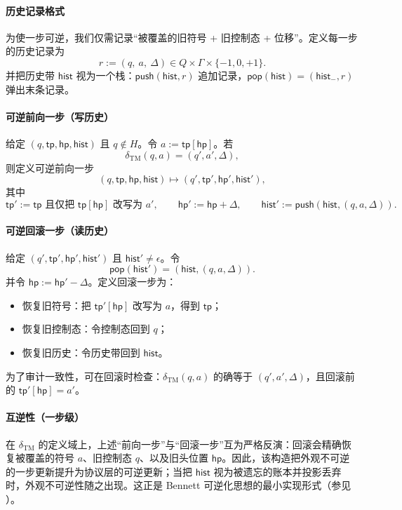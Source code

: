 \paragraph{历史记录格式}
为使一步可逆，我们仅需记录“被覆盖的旧符号 + 旧控制态 + 位移”。定义每一步的历史记录为
$$
r:=(q,\ a,\ \Delta)\in Q\times\Gamma\times\{-1,0,+1\}.
$$
并把历史带 \(\mathsf{hist}\) 视为一个栈：\(\mathsf{push}(\mathsf{hist},r)\) 追加记录，\(\mathsf{pop}(\mathsf{hist})=(\mathsf{hist}_-,r)\) 弹出末条记录。

\paragraph{可逆前向一步（写历史）}
给定 \((q,\mathsf{tp},\mathsf{hp},\mathsf{hist})\) 且 \(q\notin H\)。令 \(a:=\mathsf{tp}[\mathsf{hp}]\)。若
$$
\delta_{\mathrm{TM}}(q,a)=(q',a',\Delta),
$$
则定义可逆前向一步
$$
(q,\mathsf{tp},\mathsf{hp},\mathsf{hist})\mapsto(q',\mathsf{tp}',\mathsf{hp}',\mathsf{hist}'),
$$
其中
$$
\mathsf{tp}' := \mathsf{tp}\text{ 且仅把 }\mathsf{tp}[\mathsf{hp}]\text{ 改写为 }a',\qquad
\mathsf{hp}':=\mathsf{hp}+\Delta,\qquad
\mathsf{hist}':=\mathsf{push}(\mathsf{hist},(q,a,\Delta)).
$$

\paragraph{可逆回滚一步（读历史）}
给定 \((q',\mathsf{tp}',\mathsf{hp}',\mathsf{hist}')\) 且 \(\mathsf{hist}'\neq\epsilon\)。令
$$
\mathsf{pop}(\mathsf{hist}')=(\mathsf{hist},(q,a,\Delta)).
$$
并令 \(\mathsf{hp}:=\mathsf{hp}'-\Delta\)。定义回滚一步为：
\begin{itemize}
  \item 恢复旧符号：把 \(\mathsf{tp}'[\mathsf{hp}]\) 改写为 \(a\)，得到 \(\mathsf{tp}\)；
  \item 恢复旧控制态：令控制态回到 \(q\)；
  \item 恢复旧历史：令历史带回到 \(\mathsf{hist}\)。
\end{itemize}
为了审计一致性，可在回滚时检查：\(\delta_{\mathrm{TM}}(q,a)\) 的确等于 \((q',a',\Delta)\)，且回滚前的 \(\mathsf{tp}'[\mathsf{hp}]=a'\)。

\paragraph{互逆性（一步级）}
在 \(\delta_{\mathrm{TM}}\) 的定义域上，上述“前向一步”与“回滚一步”互为严格反演：回滚会精确恢复被覆盖的符号 \(a\)、旧控制态 \(q\)、以及旧头位置 \(\mathsf{hp}\)。因此，该构造把外观不可逆的一步更新提升为协议层的可逆更新；当把 \(\mathsf{hist}\) 视为被遗忘的账本并投影丢弃时，外观不可逆性随之出现。这正是 Bennett 可逆化思想的最小实现形式（参见 \cite{Bennett1973}）。

